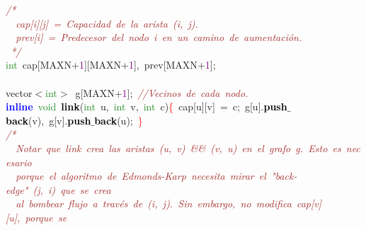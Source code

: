 
{\ttfamily \raggedright {
\noindent
\mbox{}\textit{\textcolor{Brown}{/*}} \\
\mbox{}\textit{\textcolor{Brown}{\ \ cap[i][j]\ =\ Capacidad\ de\ la\ arista\ (i,\ j).}} \\
\mbox{}\textit{\textcolor{Brown}{\ \ prev[i]\ =\ Predecesor\ del\ nodo\ i\ en\ un\ camino\ de\ aumentación.}} \\
\mbox{}\textit{\textcolor{Brown}{\ */}} \\
\mbox{}\textcolor{ForestGreen}{int}\ cap\textcolor{BrickRed}{[}MAXN\textcolor{BrickRed}{+}\textcolor{Purple}{1}\textcolor{BrickRed}{][}MAXN\textcolor{BrickRed}{+}\textcolor{Purple}{1}\textcolor{BrickRed}{],}\ prev\textcolor{BrickRed}{[}MAXN\textcolor{BrickRed}{+}\textcolor{Purple}{1}\textcolor{BrickRed}{];} \\
\mbox{} \\
\mbox{}vector\textcolor{BrickRed}{$<$}\textcolor{ForestGreen}{int}\textcolor{BrickRed}{$>$}\ g\textcolor{BrickRed}{[}MAXN\textcolor{BrickRed}{+}\textcolor{Purple}{1}\textcolor{BrickRed}{];}\ \textit{\textcolor{Brown}{//Vecinos\ de\ cada\ nodo.}} \\
\mbox{}\textbf{\textcolor{Blue}{inline}}\ \textcolor{ForestGreen}{void}\ \textbf{\textcolor{Black}{link}}\textcolor{BrickRed}{(}\textcolor{ForestGreen}{int}\ u\textcolor{BrickRed}{,}\ \textcolor{ForestGreen}{int}\ v\textcolor{BrickRed}{,}\ \textcolor{ForestGreen}{int}\ c\textcolor{BrickRed}{)}\textcolor{Red}{\{}\ cap\textcolor{BrickRed}{[}u\textcolor{BrickRed}{][}v\textcolor{BrickRed}{]}\ \textcolor{BrickRed}{=}\ c\textcolor{BrickRed}{;}\ g\textcolor{BrickRed}{[}u\textcolor{BrickRed}{].}\textbf{\textcolor{Black}{push$\_$back}}\textcolor{BrickRed}{(}v\textcolor{BrickRed}{),}\ g\textcolor{BrickRed}{[}v\textcolor{BrickRed}{].}\textbf{\textcolor{Black}{push$\_$back}}\textcolor{BrickRed}{(}u\textcolor{BrickRed}{);}\ \textcolor{Red}{\}} \\
\mbox{}\textit{\textcolor{Brown}{/*}} \\
\mbox{}\textit{\textcolor{Brown}{\ \ Notar\ que\ link\ crea\ las\ aristas\ (u,\ v)\ \&\&\ (v,\ u)\ en\ el\ grafo\ g.\ Esto\ es\ necesario}} \\
\mbox{}\textit{\textcolor{Brown}{\ \ porque\ el\ algoritmo\ de\ Edmonds-Karp\ necesita\ mirar\ el\ "{}back-edge"{}\ (j,\ i)\ que\ se\ crea}} \\
\mbox{}\textit{\textcolor{Brown}{\ \ al\ bombear\ flujo\ a\ través\ de\ (i,\ j).\ Sin\ embargo,\ no\ modifica\ cap[v][u],\ porque\ se}} \\
}}
